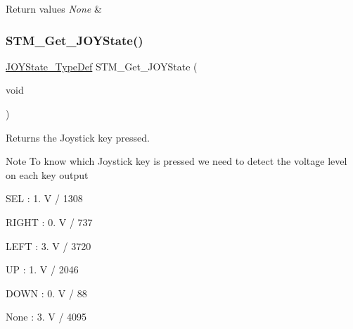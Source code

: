 \begin{DoxyRetVals}{Return values}
{\em None} & \\
\hline
\end{DoxyRetVals}
\mbox{\label{group___s_t_m32_f1_x_x___n_u_c_l_e_o___l_o_w___l_e_v_e_l___private___functions_gab68de4912bc80f43614605cd410a0b4d}} 
\subsubsection{\texorpdfstring{STM\_Get\_JOYState()}{STM\_Get\_JOYState()}}
{\footnotesize\ttfamily \mbox{\hyperlink{group___s_t_m32_f1_x_x___n_u_c_l_e_o___l_o_w___l_e_v_e_l___exported___types_ga7466d9ae142b713772373c9ddfc90332}{J\+O\+Y\+State\+\_\+\+Type\+Def}} S\+T\+M\+\_\+\+Get\+\_\+\+J\+O\+Y\+State (\begin{DoxyParamCaption}\item[{void}]{ }\end{DoxyParamCaption})}



Returns the Joystick key pressed. 

\begin{DoxyNote}{Note}
To know which Joystick key is pressed we need to detect the voltage level on each key output
\begin{DoxyItemize}
\item S\+EL \+: 1. V / 1308
\item R\+I\+G\+HT \+: 0. V / 737
\item L\+E\+FT \+: 3. V / 3720
\item UP \+: 1. V / 2046
\item D\+O\+WN \+: 0. V / 88
\item None \+: 3. V / 4095 
\end{DoxyItemize}
\end{DoxyNote}

